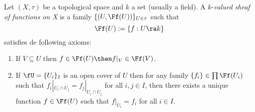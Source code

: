 \begin{defin*}
  Let $(X,\tau)$ be a topological space and $k$ a set (usually a field). A $k$-\emph{valued
    sheaf of functions on X} is a family $\{(U,\Ff(U))\}_{U\in\tau}$ such that
  \[
    \Ff(U):=\{f:U\ra k\}
  \]
  satisfies de following axioms:
  \begin{enumerate}
  \item If $V\subseteq U$ then $f\in\Ff(U)\then f|_V\in\Ff(V)$.
  \item If $\fU=\{U_i\}_I$ is an open cover of $U$ then for any family $\{f_i\}\in\prod\Ff(U_i)$
    such that $f_i|_{U_i\cap U_j}=f_j|_{U_i\cap U_j}$ for all $i,j\in I$, then there exists a
    unique function $f\in\Ff(U)$ such that $f|_{U_i}=f_i$ for all $i\in I$.
  \end{enumerate}
\end{defin*}